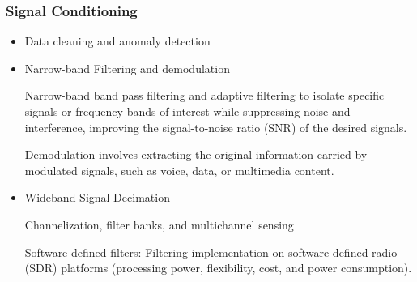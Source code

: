 \documentclass[17pt,a4paper]{extarticle}
\begin{document}
\subsubsection{Signal Conditioning}
\begin{itemize}
\item Data cleaning and anomaly detection

\item Narrow-band Filtering  and demodulation

Narrow-band band pass filtering and adaptive filtering to isolate specific signals or frequency bands of interest while suppressing noise and interference, improving the signal-to-noise ratio (SNR) of the desired signals.



Demodulation involves extracting the original information carried by modulated signals, such as voice, data, or multimedia content.

\item Wideband Signal Decimation

Channelization, filter banks, and multichannel sensing
 
Software-defined filters: Filtering implementation on software-defined radio (SDR) platforms  (processing power, flexibility, cost, and power consumption).

\end{itemize}

\clearpage\newpage
\end{document}
